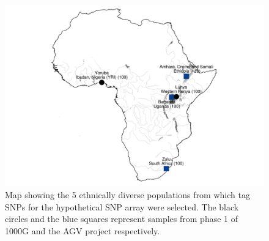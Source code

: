 \begin{figure}[htbp]
\centering
\includegraphics{fig/afr5pop}
\caption[Map showing 5 populations from which tag SNPs were selected.]{Map showing the 5 ethnically diverse populations from which tag SNPs for the hypothetical SNP array were selected. The black circles and the blue squares represent samples from phase 1 of \gls{1000G}\cite{1000G2012} and the \gls{AGV} project\cite{Gurdasani2015} respectively.}
\label{fig:afr5pop}
\end{figure}